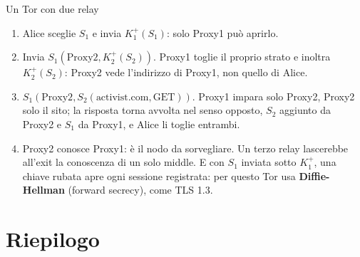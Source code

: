 \begin{esercizio}{Un Tor con due relay}
\svolgimento
\begin{center}
\end{center}
\begin{enumerate}[label=(\alph*)]
    \item Alice sceglie $S_1$ e invia $K_1^+(S_1)$: solo Proxy1 può aprirlo.
    \item Invia $S_1(\text{Proxy2}, K_2^+(S_2))$. Proxy1 toglie il proprio strato e inoltra $K_2^+(S_2)$: Proxy2 vede l'indirizzo di Proxy1,
          non quello di Alice.
    \item $S_1(\text{Proxy2}, S_2(\text{activist.com}, \text{GET}))$. Proxy1 impara solo Proxy2, Proxy2 solo il sito; la risposta torna
          avvolta nel senso opposto, $S_2$ aggiunto da Proxy2 e $S_1$ da Proxy1, e Alice li toglie entrambi.
    \item Proxy2 conosce Proxy1: è il nodo da sorvegliare. Un terzo relay lascerebbe all'exit la conoscenza di un solo middle. E con $S_1$
          inviata sotto $K_1^+$, una chiave rubata apre ogni sessione registrata: per questo Tor usa \textbf{Diffie-Hellman} (forward
          secrecy), come TLS 1.3.
\end{enumerate}
\end{esercizio}

\section{Riepilogo}

